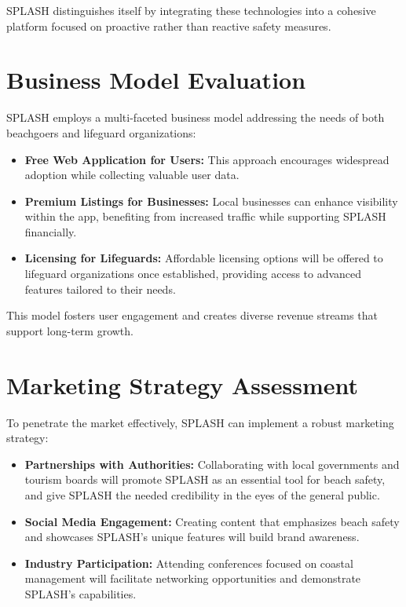SPLASH distinguishes itself by integrating these technologies into a cohesive platform focused on proactive rather than reactive safety measures.

\section{Business Model Evaluation}
SPLASH employs a multi-faceted business model addressing the needs of both beachgoers and lifeguard organizations:

\begin{itemize}
    \item \textbf{Free Web Application for Users:} This approach encourages widespread adoption while collecting valuable user data.
    \item \textbf{Premium Listings for Businesses:} Local businesses can enhance visibility within the app, benefiting from increased traffic while supporting SPLASH financially.
    \item \textbf{Licensing for Lifeguards:} Affordable licensing options will be offered to lifeguard organizations once established, providing access to advanced features tailored to their needs.
\end{itemize}

This model fosters user engagement and creates diverse revenue streams that support long-term growth.

\section{Marketing Strategy Assessment}
To penetrate the market effectively, SPLASH can implement a robust marketing strategy:

\begin{itemize}
    \item \textbf{Partnerships with Authorities:} Collaborating with local governments and tourism boards will promote SPLASH as an essential tool for beach safety, and give SPLASH the needed credibility in the eyes of the general public.
    \item \textbf{Social Media Engagement:} Creating content that emphasizes beach safety and showcases SPLASH's unique features will build brand awareness.
    \item \textbf{Industry Participation:} Attending conferences focused on coastal management will facilitate networking opportunities and demonstrate SPLASH's capabilities.
\end{itemize}

